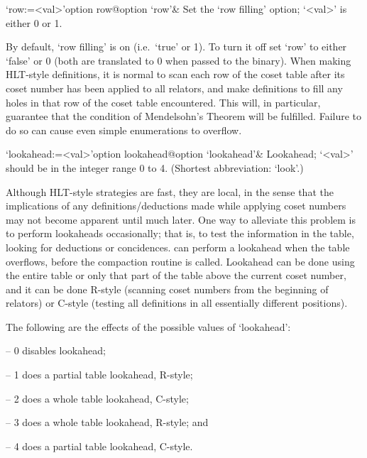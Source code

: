 \enditems


\beginitems

\>`row:=<val>'{option row}@{option `row'}&
Set the \lq{}row filling' option; `<val>' is either 0 or 1.

By default, \lq{}row filling' is on (i.e.~`true' or 1). To turn it off
set `row' to either `false' or 0 (both are translated to 0 when passed
to  the {\ACE}  binary).   When making  HLT-style  definitions, it  is
normal to scan each row of  the coset table after its coset number has
been applied to  all relators, and make definitions  to fill any holes
in that row of the  coset table encountered. This will, in particular,
guarantee  that   the  condition  of  Mendelsohn's   Theorem  will  be
fulfilled.  Failure  to do  so can cause  even simple  enumerations to
overflow.

\>`lookahead:=<val>'{option lookahead}@{option `lookahead'}&
Lookahead; `<val>' should be in the integer range 0 to 4.
(Shortest abbreviation: `look'.)
  
Although HLT-style strategies are fast, they are local, in  the  sense
that  the  implications  of  any  definitions/deductions  made   while
applying coset numbers may not become apparent until much  later.  One
way to alleviate this problem is to perform  lookaheads  occasionally;
that is, to test the information in the table, looking for  deductions
or  concidences.  {\ACE}  can  perform  a  lookahead  when  the  table
overflows, before the compaction routine is called. Lookahead  can  be
done using the entire table or only that part of the table  above  the
current coset number, and it  can  be  done  R-style  (scanning  coset
numbers from the  beginning  of  relators)  or  C-style  (testing  all
definitions in all essentially different positions).

The following are the effects of the possible values of `lookahead':

\beginlist

\item{--} 0 disables lookahead;
\item{--} 1 does a partial table lookahead, R-style; 
\item{--} 2 does a whole table lookahead, C-style; 
\item{--} 3 does a whole table lookahead, R-style; and
\item{--} 4 does a partial table lookahead, C-style.  

